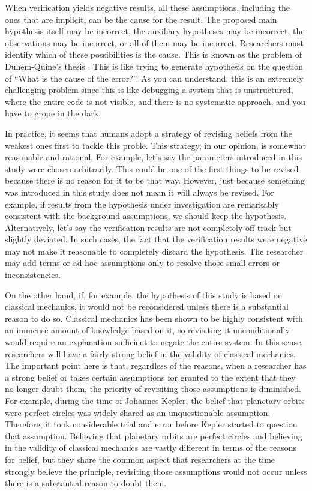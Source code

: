 \documentclass{book}
\begin{document}
When verification yields negative results, all these assumptions, including the ones that are implicit, can be the cause for the result. The proposed main hypothesis itself may be incorrect, the auxiliary hypotheses may be incorrect, the observations may be incorrect, or all of them may be incorrect. Researchers must identify which of these possibilities is the cause. This is known as the problem of Duhem-Quine's thesis \cite{sep-scientific-underdetermination}. This is like trying to generate hypothesis on the question of ``What is the cause of the error?''. As you can understand, this is an extremely challenging problem since this is like debugging a system that is unstructured, where the entire code is not visible, and there is no systematic approach, and you have to grope in the dark. 

In practice, it seems that humans adopt a strategy of revising beliefs from the weakest ones first to tackle this proble. This strategy, in our opinion, is somewhat reasonable and rational. For example, let's say the parameters introduced in this study were chosen arbitrarily. This could be one of the first things to be revised because there is no reason for it to be that way. However, just because something was introduced in this study does not mean it will always be revised. For example, if results from the hypothesis under investigation are remarkably consistent with the background assumptions, we should keep the hypothesis. Alternatively, let's say the verification results are not completely off track but slightly deviated. In such cases, the fact that the verification results were negative may not make it reasonable to completely discard the hypothesis. The researcher may add terms or ad-hoc assumptions only to resolve those small errors or inconsistencies.

On the other hand, if, for example, the hypothesis of this study is based on classical mechanics, it would not be reconsidered unless there is a substantial reason to do so. Classical mechanics has been shown to be highly consistent with an immense amount of knowledge based on it, so revisiting it unconditionally would require an explanation sufficient to negate the entire system. In this sense, researchers will have a fairly strong belief in the validity of classical mechanics. The important point here is that, regardless of the reasons, when a researcher has a strong belief or takes certain assumptions for granted to the extent that they no longer doubt them, the priority of revisiting those assumptions is diminished. For example, during the time of Johannes Kepler, the belief that planetary orbits were perfect circles was widely shared as an unquestionable assumption. Therefore, it took considerable trial and error before Kepler started to question that assumption. Believing that planetary orbits are perfect circles and believing in the validity of classical mechanics are vastly different in terms of the reasons for belief, but they share the common aspect that researchers at the time strongly believe the principle, revisiting those assumptions would not occur unless there is a substantial reason to doubt them.
\end{document}
